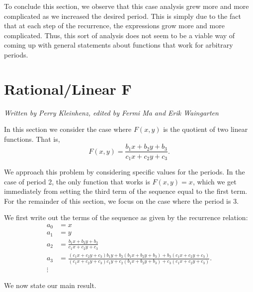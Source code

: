 \documentclass[12pt]{article}
\begin{document}
To conclude this section, we observe that this case analysis grew more and more complicated as we increased the desired period. This is simply due to the fact that at each step of the recurrence, the expressions grow more and more complicated. Thus, this sort of analysis does not seem to be a viable way of coming up with general statements about functions that work for arbitrary periods.

\section{Rational/Linear F}
\label{rational and linear F}
\emph{Written by Perry Kleinhenz, edited by Fermi Ma and Erik Waingarten}

In this section we consider the case where $F(x,y)$ is the quotient of two linear functions. That is,
\begin{equation}
\label{rationallinear}
F(x,y) = \frac{ b_1 x + b_2 y + b_3}{ c_1 x+ c_2 y + c_3}.
\end{equation}

We approach this problem by considering specific values for the periods. In the case of period 2, the only function that works is $F(x,y) = x$, which we get immediately from setting the third term of the sequence equal to the first term. For the remainder of this section, we focus on the case where the period is 3.

We first write out the terms of the sequence as given by the recurrence relation:
\begin{align*}
a_0 &= x \\ 
a_1 &= y \\
a_2 &= \frac{ b_1 x + b_2 y + b_3}{ c_1 x+ c_2 y + c_3}\\
a_3 &= \frac{(c_1 x+ c_2 y + c_3) b_1 y + b_2 (b_1 x + b_2 y + b_3)+ b_3(c_1 x+ c_2 y + c_3)}{ (c_1 x+ c_2 y + c_3)c_1 y+ c_2 (b_1 x + b_2 y + b_3) + c_3(c_1 x+ c_2 y + c_3)}.\\
\vdots
\end{align*}

We now state our main result.
\end{document}
